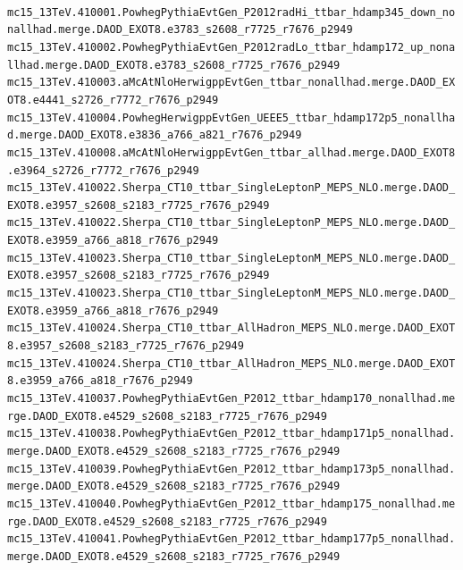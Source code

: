 \noindent
\\
{\scriptsize
\verb|mc15_13TeV.410001.PowhegPythiaEvtGen_P2012radHi_ttbar_hdamp345_down_nonallhad.merge.DAOD_EXOT8.e3783_s2608_r7725_r7676_p2949|\\
\verb|mc15_13TeV.410002.PowhegPythiaEvtGen_P2012radLo_ttbar_hdamp172_up_nonallhad.merge.DAOD_EXOT8.e3783_s2608_r7725_r7676_p2949|\\
\verb|mc15_13TeV.410003.aMcAtNloHerwigppEvtGen_ttbar_nonallhad.merge.DAOD_EXOT8.e4441_s2726_r7772_r7676_p2949|\\
\verb|mc15_13TeV.410004.PowhegHerwigppEvtGen_UEEE5_ttbar_hdamp172p5_nonallhad.merge.DAOD_EXOT8.e3836_a766_a821_r7676_p2949|\\
\verb|mc15_13TeV.410008.aMcAtNloHerwigppEvtGen_ttbar_allhad.merge.DAOD_EXOT8.e3964_s2726_r7772_r7676_p2949|\\
\verb|mc15_13TeV.410022.Sherpa_CT10_ttbar_SingleLeptonP_MEPS_NLO.merge.DAOD_EXOT8.e3957_s2608_s2183_r7725_r7676_p2949|\\
\verb|mc15_13TeV.410022.Sherpa_CT10_ttbar_SingleLeptonP_MEPS_NLO.merge.DAOD_EXOT8.e3959_a766_a818_r7676_p2949|\\
\verb|mc15_13TeV.410023.Sherpa_CT10_ttbar_SingleLeptonM_MEPS_NLO.merge.DAOD_EXOT8.e3957_s2608_s2183_r7725_r7676_p2949|\\
\verb|mc15_13TeV.410023.Sherpa_CT10_ttbar_SingleLeptonM_MEPS_NLO.merge.DAOD_EXOT8.e3959_a766_a818_r7676_p2949|\\
\verb|mc15_13TeV.410024.Sherpa_CT10_ttbar_AllHadron_MEPS_NLO.merge.DAOD_EXOT8.e3957_s2608_s2183_r7725_r7676_p2949|\\
\verb|mc15_13TeV.410024.Sherpa_CT10_ttbar_AllHadron_MEPS_NLO.merge.DAOD_EXOT8.e3959_a766_a818_r7676_p2949|\\
\verb|mc15_13TeV.410037.PowhegPythiaEvtGen_P2012_ttbar_hdamp170_nonallhad.merge.DAOD_EXOT8.e4529_s2608_s2183_r7725_r7676_p2949|\\
\verb|mc15_13TeV.410038.PowhegPythiaEvtGen_P2012_ttbar_hdamp171p5_nonallhad.merge.DAOD_EXOT8.e4529_s2608_s2183_r7725_r7676_p2949|\\
\verb|mc15_13TeV.410039.PowhegPythiaEvtGen_P2012_ttbar_hdamp173p5_nonallhad.merge.DAOD_EXOT8.e4529_s2608_s2183_r7725_r7676_p2949|\\
\verb|mc15_13TeV.410040.PowhegPythiaEvtGen_P2012_ttbar_hdamp175_nonallhad.merge.DAOD_EXOT8.e4529_s2608_s2183_r7725_r7676_p2949|\\
\verb|mc15_13TeV.410041.PowhegPythiaEvtGen_P2012_ttbar_hdamp177p5_nonallhad.merge.DAOD_EXOT8.e4529_s2608_s2183_r7725_r7676_p2949|\\
}
